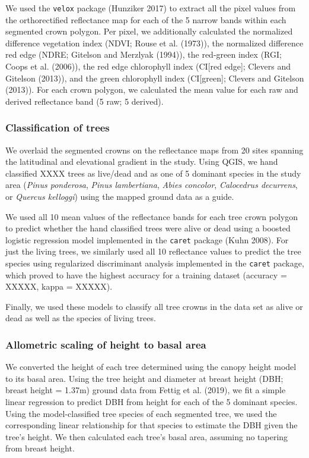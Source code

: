 \documentclass[]{article}
\begin{document}
We used the \texttt{velox} package (Hunziker 2017) to extract all the
pixel values from the orthorectified reflectance map for each of the 5
narrow bands within each segmented crown polygon. Per pixel, we
additionally calculated the normalized difference vegetation index
(NDVI; Rouse et al. (1973)), the normalized difference red edge (NDRE;
Gitelson and Merzlyak (1994)), the red-green index (RGI; Coops et al.
(2006)), the red edge chlorophyll index (CI{[}red edge{]}; Clevers and
Gitelson (2013)), and the green chlorophyll index (CI{[}green{]};
Clevers and Gitelson (2013)). For each crown polygon, we calculated the
mean value for each raw and derived reflectance band (5 raw; 5 derived).

\subsubsection{Classification of trees}\label{classification-of-trees}

We overlaid the segmented crowns on the reflectance maps from 20 sites
spanning the latitudinal and elevational gradient in the study. Using
QGIS, we hand classified XXXX trees as live/dead and as one of 5
dominant species in the study area (\emph{Pinus ponderosa}, \emph{Pinus
lambertiana}, \emph{Abies concolor}, \emph{Calocedrus decurrens}, or
\emph{Quercus kelloggi}) using the mapped ground data as a guide.

We used all 10 mean values of the reflectance bands for each tree crown
polygon to predict whether the hand classified trees were alive or dead
using a boosted logistic regression model implemented in the
\texttt{caret} package (Kuhn 2008). For just the living trees, we
similarly used all 10 reflectance values to predict the tree species
using regularized discriminant analysis implemented in the
\texttt{caret} package, which proved to have the highest accuracy for a
training dataset (accuracy = XXXXX, kappa = XXXXX).

Finally, we used these models to classify all tree crowns in the data
set as alive or dead as well as the species of living trees.

\subsubsection{Allometric scaling of height to basal
area}\label{allometric-scaling-of-height-to-basal-area}

We converted the height of each tree determined using the canopy height
model to its basal area. Using the tree height and diameter at breast
height (DBH; breast height = 1.37m) ground data from Fettig et al.
(2019), we fit a simple linear regression to predict DBH from height for
each of the 5 dominant species. Using the model-classified tree species
of each segmented tree, we used the corresponding linear relationship
for that species to estimate the DBH given the tree's height. We then
calculated each tree's basal area, assuming no tapering from breast
height.
\end{document}

